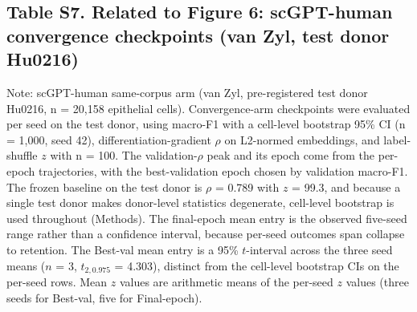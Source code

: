 \documentclass[12pt,a4paper]{article}
\begin{document}
\needspace{45mm}
\subsection*{Table S7. Related to Figure 6: scGPT-human convergence checkpoints (van Zyl, test donor Hu0216)}
\label{tab:S7}

\begingroup
\small
\centering
{}
\endgroup

Note: scGPT-human same-corpus arm (van Zyl, pre-registered test donor Hu0216, n = 20,158 epithelial cells). Convergence-arm checkpoints were evaluated per seed on the test donor, using macro-F1 with a cell-level bootstrap 95\% CI (n = 1,000, seed 42), differentiation-gradient $\rho$ on L2-normed embeddings, and label-shuffle $z$ with n = 100. The validation-$\rho$ peak and its epoch come from the per-epoch trajectories, with the best-validation epoch chosen by validation macro-F1. The frozen baseline on the test donor is $\rho$ = 0.789 with $z$ = 99.3, and because a single test donor makes donor-level statistics degenerate, cell-level bootstrap is used throughout (Methods). The final-epoch mean entry is the observed five-seed range rather than a confidence interval, because per-seed outcomes span collapse to retention. The Best-val mean entry is a 95\% $t$-interval across the three seed means ($n$ = 3, $t_{2,0.975}$ = 4.303), distinct from the cell-level bootstrap CIs on the per-seed rows. Mean $z$ values are arithmetic means of the per-seed $z$ values (three seeds for Best-val, five for Final-epoch).
\end{document}

